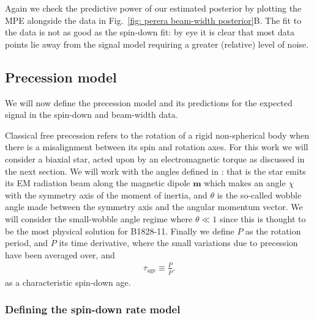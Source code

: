 \documentclass[../full_thesis/full_thesis.tex]{subfiles}
\newcommand{\tauAge}{\tau_{\textrm{age}}}
\begin{document}
Again we check the predictive power of our estimated posterior by plotting the
MPE alongside the data in Fig.~\ref{fig: perera beam-width posterior}B. The fit
to the data is not as good as the spin-down fit: by eye it is clear that most
data points lie away from the signal model requiring a greater (relative) level
of noise.

\subsection{Precession model}
\label{sec: The precession model}

We will now define the precession model and its predictions for the expected
signal in the spin-down and beam-width data.

Classical free precession refers to the rotation of a rigid non-spherical body
when there is a misalignment between its spin and rotation axes. For this work
we will consider a biaxial star, acted upon by an electromagnetic torque as
discussed in the next section. We will work with the angles defined in
\citet{Jones2001}: that is the star emits its EM radiation beam along the magnetic
dipole $\mathbf{m}$ which makes an angle $\chi$ with the symmetry axis of the
moment of inertia, and $\theta$ is the so-called wobble angle made between the
symmetry axis and the angular momentum vector. We will consider the
small-wobble angle regime where $\theta \ll 1$ since this is thought to be the
most physical solution for B1828-11.  Finally we define $P$ as the rotation
period, and $\dot P$ its time derivative, where the small variations due to
precession have been averaged over, and
\begin{align}
    \tauAge \equiv  \frac{P}{\dot P}.
\end{align}
as a characteristic spin-down age.

\subsubsection{Defining the spin-down rate model}
\end{document}
